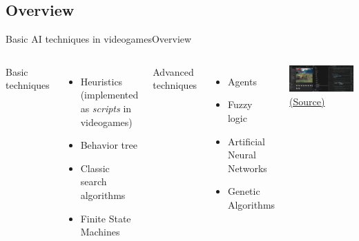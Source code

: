 \documentclass[10pt,compress]{beamer} %
\begin{document}
\subsection{Overview}
\begin{frame}{Basic AI techniques in videogames}{Overview}
    \begin{columns}
	Basic techniques
 	\begin{itemize}
 		\item Heuristics (implemented as \textit{scripts} in videogames)
        \item Behavior tree 
 		\item Classic search algorithms
		\item Finite State Machines
 	\end{itemize}
	
	Advanced techniques
 	\begin{itemize}
 		\item Agents
		\item Fuzzy logic
		\item Artificial Neural Networks
		\item Genetic Algorithms
 	\end{itemize}
        \includegraphics[width=0.9\linewidth]{figs/unity-overview.png}\\
		\centering \tiny{\href{https://code.visualstudio.com/docs/other/unity}{(Source)}}
    \end{columns}
\end{frame}
\end{document}
